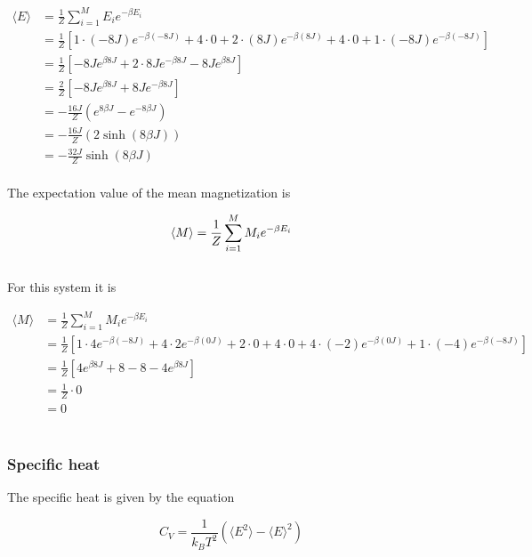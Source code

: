 \documentclass{article}
\begin{document}
\begin{align*}
  \langle E \rangle &= \frac{1}{Z} \sum _{i=1} ^M E_i e^{- \beta E_i} \\
  &= \frac{1}{Z} \left[ 1 \cdot (-8J) e^{- \beta (-8J)} + 4 \cdot 0 + 2 \cdot (8J) e^{- \beta (8J)} + 4 \cdot 0 + 1 \cdot (-8J) e^{- \beta (-8J)} \right] \\
  &= \frac{1}{Z} \left[ - 8J e^{\beta 8J} + 2 \cdot 8J e^{- \beta 8J} - 8J e^{ \beta 8J} \right] \\
  &= \frac{2}{Z} \left[ - 8J e^{\beta 8 J} + 8 J e^{- \beta 8 J} \right] \\
  &= - \frac{16 J}{Z} \left( e^{8 \beta J} - e^{- 8 \beta J} \right) \\
  &= - \frac{16 J}{Z} (2 \sinh(8 \beta J) ) \\
  &= - \frac{32 J}{Z} \sinh(8 \beta J)
\end{align*} \\

The expectation value of the mean magnetization is

\begin{equation}    \label{eq:meanmagnetization}
    \langle M \rangle = \frac{1}{Z} \sum _{i=1} ^M M_i e^{- \beta E_i} \\
\end{equation} \\

For this system it is

\begin{align*}
  \langle M \rangle &= \frac{1}{Z} \sum _{i=1} ^M M_i e^{- \beta E_i} \\
  &= \frac{1}{Z} \left[1 \cdot 4 e^{- \beta (-8J)} + 4 \cdot 2 e^{- \beta (0J)} + 2 \cdot 0 + 4 \cdot 0 + 4 \cdot (-2) e^{- \beta (0J)} + 1 \cdot (-4) e^{- \beta (-8J)} \right] \\
  &= \frac{1}{Z} \left[ 4 e^{\beta 8J} + 8 - 8 - 4 e^{ \beta 8J} \right] \\
  &= \frac{1}{Z} \cdot 0 \\
  &= 0
\end{align*} \\


\subsubsection{Specific heat}

The specific heat is given by the equation

\begin{equation}    \label{eq:specificheat}
    C_V = \frac{1}{k_B T^2} \left( \langle E^2 \rangle - \langle E \rangle ^2 \right)
\end{equation} \\
\end{document}
